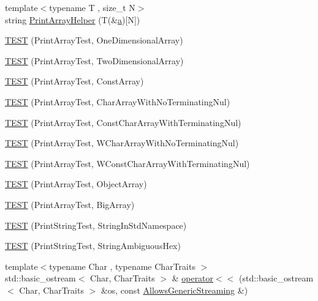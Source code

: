 \begin{DoxyCompactItemize}
\item 
{\footnotesize template$<$typename T , size\+\_\+t N$>$ }\\string \hyperlink{namespacetesting_1_1gtest__printers__test_a10300ded1e327c98c6a36beb7ad49e58}{Print\+Array\+Helper} (T(\&\hyperlink{_07copy_08_2_read_camera_model_8m_a551a3d351eadcc0b9b1a2f24f0fb5ea0}{a})\mbox{[}N\mbox{]})
\item 
\hyperlink{namespacetesting_1_1gtest__printers__test_a3845c4717b03cb5ad309c7d9a37acb0a}{T\+E\+ST} (Print\+Array\+Test, One\+Dimensional\+Array)
\item 
\hyperlink{namespacetesting_1_1gtest__printers__test_ac366b9ec749b2499d21583d3b8f86273}{T\+E\+ST} (Print\+Array\+Test, Two\+Dimensional\+Array)
\item 
\hyperlink{namespacetesting_1_1gtest__printers__test_a8b5638f178c12f58707ca0f02a3b4d41}{T\+E\+ST} (Print\+Array\+Test, Const\+Array)
\item 
\hyperlink{namespacetesting_1_1gtest__printers__test_a3bae023a42049745b49fa1f2db9a0cb2}{T\+E\+ST} (Print\+Array\+Test, Char\+Array\+With\+No\+Terminating\+Nul)
\item 
\hyperlink{namespacetesting_1_1gtest__printers__test_ab51b9ecaca7d635326101b23d5e8afd2}{T\+E\+ST} (Print\+Array\+Test, Const\+Char\+Array\+With\+Terminating\+Nul)
\item 
\hyperlink{namespacetesting_1_1gtest__printers__test_ac19ec2732031bfe83b30ea9f00259ef3}{T\+E\+ST} (Print\+Array\+Test, W\+Char\+Array\+With\+No\+Terminating\+Nul)
\item 
\hyperlink{namespacetesting_1_1gtest__printers__test_a6a7cbcdbe748a1d4e90658f48f36c9da}{T\+E\+ST} (Print\+Array\+Test, W\+Const\+Char\+Array\+With\+Terminating\+Nul)
\item 
\hyperlink{namespacetesting_1_1gtest__printers__test_af91d8ad9d6c7547913fe05c7acc44114}{T\+E\+ST} (Print\+Array\+Test, Object\+Array)
\item 
\hyperlink{namespacetesting_1_1gtest__printers__test_a596493b56489aa1571fa26d1402e7116}{T\+E\+ST} (Print\+Array\+Test, Big\+Array)
\item 
\hyperlink{namespacetesting_1_1gtest__printers__test_abbd355e76033f0defd76c37523ad0f60}{T\+E\+ST} (Print\+String\+Test, String\+In\+Std\+Namespace)
\item 
\hyperlink{namespacetesting_1_1gtest__printers__test_ac20ee165500471e363011c3f664d2fb8}{T\+E\+ST} (Print\+String\+Test, String\+Ambiguous\+Hex)
\item 
{\footnotesize template$<$typename Char , typename Char\+Traits $>$ }\\std\+::basic\+\_\+ostream$<$ Char, Char\+Traits $>$ \& \hyperlink{namespacetesting_1_1gtest__printers__test_a1eb0213095e639d357692066e8505887}{operator$<$$<$} (std\+::basic\+\_\+ostream$<$ Char, Char\+Traits $>$ \&os, const \hyperlink{classtesting_1_1gtest__printers__test_1_1_allows_generic_streaming}{Allows\+Generic\+Streaming} \&)

\end{DoxyCompactItemize}
